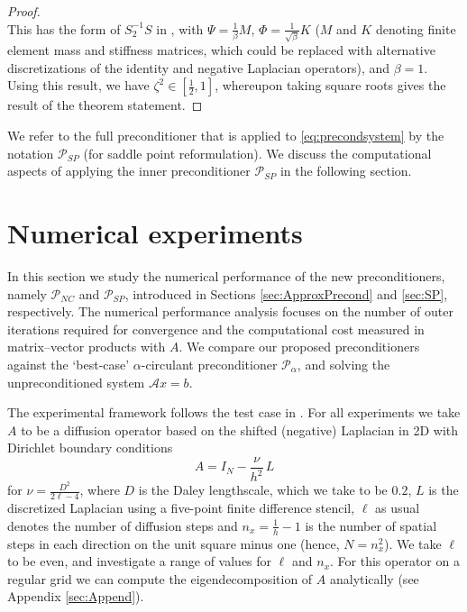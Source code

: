 \documentclass{article}
\newcommand{\sizeA}{N}
\newcommand{\phimat}{\Phi}
\newcommand{\psimat}{\Psi}
\newcommand{\lamalt}{\zeta}
\theoremstyle{definition}
\newcommand{\Lap}{L}
\begin{document}
{\begin{proof}
\begin{equation*}
			\end{equation*}
			This has the form of $S_2^{-1}S$ in \cite[Theorem 4]{pearson2012new}, with $\psimat = \frac{1}{\beta}M$, $\phimat = \frac{1}{\sqrt{\beta}}K$ ($M$ and $K$ denoting finite element mass and stiffness matrices, which could be replaced with alternative discretizations of the identity and negative Laplacian operators), and $\beta = 1$. Using this result, we have $\lamalt^2 \in \left[\frac{1}{2},1 \right]$, whereupon 
			taking square roots gives the result of the theorem statement. 
		\end{proof}
		{We refer to the full preconditioner that is applied to \eqref{eq:precondsystem} by the notation $\mathcal{P}_{SP}$ (for saddle point reformulation).}
		We discuss the computational aspects of applying the inner preconditioner $\mathcal{P}_{SP}$ in the following section.
		
		
		\section{Numerical experiments}\label{sec:Numerics}
		
		
		In this section we study the numerical performance of the new  preconditioners, namely $\mathcal{P}_{NC}$ and $\mathcal{P}_{SP}$, introduced in  Sections \ref{sec:ApproxPrecond} and \ref{sec:SP}, {respectively. The numerical performance analysis focuses on the number of outer iterations required for convergence and the computational cost measured in matrix--vector products with $A$.} We compare our proposed preconditioners against the `best-case' $\alpha$-circulant preconditioner $\mathcal{P}_{\alpha}$, and solving the unpreconditioned system $\mathcal{A}x= b$. 
		
		
		
		The experimental framework follows the test case in \cite{weaver_correlation_2016,weaver2018time}.
		For all experiments we take ${A}$ to be a diffusion operator based on the shifted (negative) Laplacian in 2D with Dirichlet boundary conditions
		\begin{equation}\label{IminusLap}
			{A} = I_\sizeA - \frac{\nu}{h^2} \, \Lap
		\end{equation}
		for $\nu = \frac{D^2}{2\ell-4}$, where $D$ is the Daley lengthscale, which we take to be $0.2$, 
		$\Lap$ is the discretized Laplacian using a five-point finite difference stencil, $\ell$ as usual denotes the number of diffusion steps and ${ n_x = \frac{1}{h}-1}$
		is the number of spatial steps in each direction on the unit square minus one (hence, $\sizeA = n_x^2$). We take $\ell$ to be even, and investigate a range of values for $\ell$ and $n_x$. For this operator on a regular grid we can compute the eigendecomposition of ${A}$ analytically (see Appendix \ref{sec:Append}). 
		
}
\end{document}
